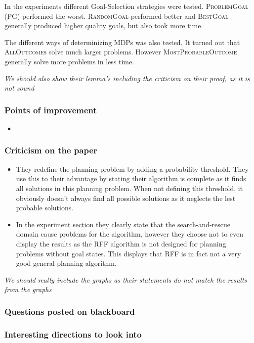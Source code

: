 \documentclass[runningheads,a4paper]{llncs}
\begin{document}
In the experiments different Goal-Selection strategies were tested.
\textsc{ProblemGoal} (PG) performed the worst. \textsc{RandomGoal} performed
better and \textsc{BestGoal} generally produced higher quality goals, but also
took more time.

The different ways of determinizing MDPs was also tested. It turned out that
\textsc{AllOutcomes} solve much larger problems. However
\textsc{MostProbableOutcome} generally solve more problems in less time.

\emph{We should also show their lemma's including the criticism on their proof, as it is not sound}

\subsubsection{Points of improvement}

\begin{itemize}
	\item
\end{itemize}

\subsubsection{Criticism on the paper}
\begin{itemize}
	\item They redefine the planning problem by adding a probability threshold. They use this to their advantage by stating their algorithm is complete as it finds all solutions in this planning problem. When not defining this threshold, it obviously doesn't always find all possible solutions as it neglects the lest probable solutions.
	\item In the experiment section they clearly state that the search-and-rescue domain cause problems for the algorithm, however they choose not to even display the results as the RFF algorithm is not designed for planning problems without goal states. This displays that RFF is in fact not a very good general planning algorithm.
\end{itemize}

\emph{ We should really include the graphs as their statements do not match the results from the graphs}

\subsubsection{Questions posted on blackboard}

\subsubsection{Interesting directions to look into}
\end{document}
